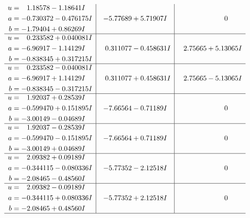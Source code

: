 \documentclass[1p]{elsarticle_modified}
\theoremstyle{definition}
\begin{document}
$$\begin{array}{c|c|c}
\begin{aligned}
u &= \phantom{-}1.18578 - 1.18641 I \\
a &= -0.730372 - 0.476175 I \\
b &= -1.79404 + 0.86269 I\end{aligned}
 & -5.77689 + 5.71907 I & \phantom{-0.000000 } 0 \\ \hline\begin{aligned}
u &= \phantom{-}0.233582 + 0.040081 I \\
a &= -6.96917 - 1.14129 I \\
b &= -0.838345 + 0.317215 I\end{aligned}
 & \phantom{-}0.311077 - 0.458631 I & \phantom{-}2.75665 + 5.13065 I \\ \hline\begin{aligned}
u &= \phantom{-}0.233582 - 0.040081 I \\
a &= -6.96917 + 1.14129 I \\
b &= -0.838345 - 0.317215 I\end{aligned}
 & \phantom{-}0.311077 + 0.458631 I & \phantom{-}2.75665 - 5.13065 I \\ \hline\begin{aligned}
u &= \phantom{-}1.92037 + 0.28539 I \\
a &= -0.599470 + 0.151895 I \\
b &= -3.00149 - 0.04689 I\end{aligned}
 & -7.66564 - 0.71189 I & \phantom{-0.000000 } 0 \\ \hline\begin{aligned}
u &= \phantom{-}1.92037 - 0.28539 I \\
a &= -0.599470 - 0.151895 I \\
b &= -3.00149 + 0.04689 I\end{aligned}
 & -7.66564 + 0.71189 I & \phantom{-0.000000 } 0 \\ \hline\begin{aligned}
u &= \phantom{-}2.09382 + 0.09189 I \\
a &= -0.344115 - 0.080336 I \\
b &= -2.08465 - 0.48560 I\end{aligned}
 & -5.77352 - 2.12518 I & \phantom{-0.000000 } 0 \\ \hline\begin{aligned}
u &= \phantom{-}2.09382 - 0.09189 I \\
a &= -0.344115 + 0.080336 I \\
b &= -2.08465 + 0.48560 I\end{aligned}
 & -5.77352 + 2.12518 I & \phantom{-0.000000 } 0\\
 \hline 
 \end{array}$$\newpage\newpage\renewcommand{\arraystretch}{1}
\end{document}
